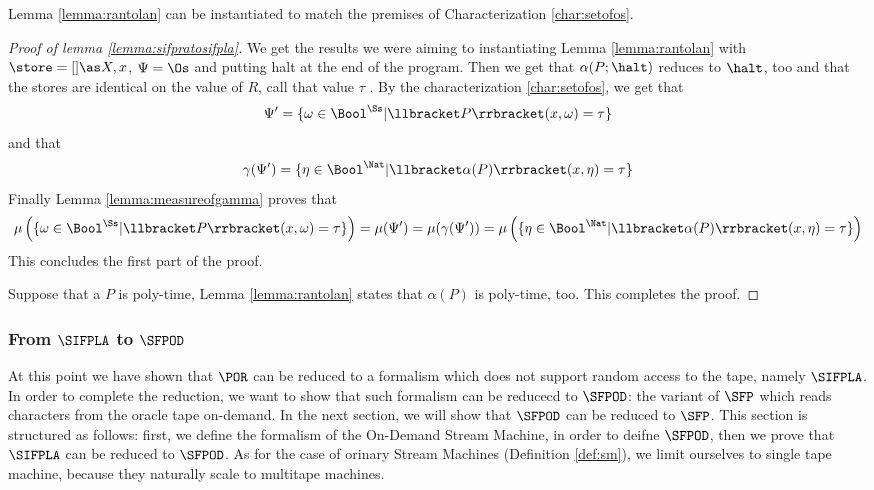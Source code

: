 Lemma \ref{lemma:rantolan} can be instantiated to match the premises of
Characterization \ref{char:setofos}.

\begin{proof}[Proof of lemma \ref{lemma:sifpratosifpla}]
  We get the results we were aiming to instantiating Lemma \ref{lemma:rantolan}
  with $\store =[]\as X, x$, $\Psi=\Os$ and putting halt at the end of the program.
  Then we get that $\alpha(P;\halt)$ reduces to $\halt$, too and that the stores
  are identical on the value of $R$, call that value $\tau$
  . By the characterization \ref{char:setofos},
  we get that
  $$
  \Psi'=
    \{\omega \in \Bool^\Ss| \llbracket P\rrbracket (x, \omega)= \tau\}
  $$
  and that
  $$
    \gamma(\Psi')=\{\eta \in \Bool^\Nat| \llbracket \alpha(P) \rrbracket(x, \eta)= \tau\}
  $$
  Finally Lemma \ref{lemma:measureofgamma} proves that
  $$
  \mu\left(\{\omega \in \Bool^\Ss| \llbracket P\rrbracket (x, \omega)= \tau\}\right)=
  \mu(\Psi')=\mu(\gamma(\Psi'))=
    \mu\left(\{\eta \in \Bool^\Nat| \llbracket \alpha(P) \rrbracket(x, \eta)= \tau\}\right)
  $$
  This concludes the first part of the proof.

  Suppose that a $P$ is poly-time, Lemma \ref{lemma:rantolan} states
  that $\alpha(P)$ is poly-time, too. This completes the proof.
\end{proof}



























\subsubsection{From $\SIFPLA$ to $\SFPOD$}
\label{subsub:sifplatosfpod}

At this point we have shown that $\POR$ can be reduced to a formalism which does
not support random access to the tape, namely $\SIFPLA$. In order to complete
the reduction, we want to show that such formalism can be reducecd to
$\SFPOD$: the variant of $\SFP$ which reads characters from the oracle tape
on-demand. In the next section, we will show that $\SFPOD$ can
be reduced to $\SFP$.
%
This section is structured as follows: first, we define the formalism of the
On-Demand Stream Machine, in order to deifne $\SFPOD$, then we prove that
$\SIFPLA$ can be reduced to $\SFPOD$.
%
As for the case of orinary Stream Machines (Definition \ref{def:sm}), we limit
ourselves to single tape machine, because they naturally scale to multitape
machines.

